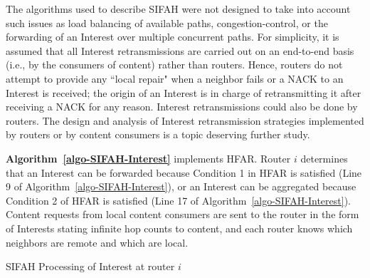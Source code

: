 \documentclass{ancs15-alternate}
\begin{document}
The algorithms used to describe SIFAH were not designed to  take into account such issues  as load balancing of available paths, congestion-control, or the forwarding of an Interest over multiple concurrent paths. 
For simplicity,  it is assumed that all Interest retransmissions are carried out on an end-to-end basis (i.e., by the consumers of content) rather than routers. Hence, routers do not attempt to provide any ``local repair" when a neighbor fails or a NACK to an Interest is received; 
the origin of an Interest is in charge of retransmitting it after receiving a NACK for any reason.
Interest retransmissions could also be done by routers.  
The design and analysis of Interest retransmission strategies implemented by routers or by content consumers  is a topic deserving further study. 

{\bf Algorithm~\ref{algo-SIFAH-Interest} } implements HFAR. Router $i$ determines that an Interest can be forwarded because  Condition 1 in HFAR is satisfied (Line 9 of Algorithm~\ref{algo-SIFAH-Interest}), or an Interest can be aggregated because Condition 2 of HFAR is  satisfied (Line 17 of Algorithm~\ref{algo-SIFAH-Interest}). 
Content requests from local content consumers are sent to the router in the form of Interests stating infinite hop counts to content, and  each router knows which neighbors are remote  and which are local.

\begin{algorithm}[h]
\caption{SIFAH Processing of Interest at router $i$}
\label{algo-SIFAH-Interest}
{\fontsize{8}{8}\selectfont
\begin{algorithmic}[1]


		\ELSE 
          		\ELSE
			\ENDIF
		\ENDIF
	\ELSE 
		\ELSE
		\ENDIF
	\ENDIF
\ENDIF
{}
\end{algorithmic}}
\end{algorithm}
\end{document}
